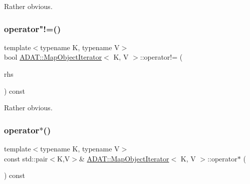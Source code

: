 Rather obvious. 

\mbox{\label{classADAT_1_1MapObjectIterator_a1110663c46b0e652d8ecd0dbe80bd255}} 
\subsubsection{\texorpdfstring{operator"!=()}{operator!=()}\hspace{0.1cm}{\footnotesize\ttfamily [3/3]}}
{\footnotesize\ttfamily template$<$typename K, typename V$>$ \\
bool \mbox{\hyperlink{classADAT_1_1MapObjectIterator}{A\+D\+A\+T\+::\+Map\+Object\+Iterator}}$<$ K, V $>$\+::operator!= (\begin{DoxyParamCaption}\item[{const \mbox{\hyperlink{classADAT_1_1MapObjectIterator}{Map\+Object\+Iterator}}$<$ K, V $>$ \&}]{rhs }\end{DoxyParamCaption}) const\hspace{0.3cm}{\ttfamily [inline]}}



Rather obvious. 

\mbox{\label{classADAT_1_1MapObjectIterator_a3faecdcae68181e91e40dad404296ed7}} 
\subsubsection{\texorpdfstring{operator$\ast$()}{operator*()}\hspace{0.1cm}{\footnotesize\ttfamily [1/3]}}
{\footnotesize\ttfamily template$<$typename K, typename V$>$ \\
const std\+::pair$<$K,V$>$\& \mbox{\hyperlink{classADAT_1_1MapObjectIterator}{A\+D\+A\+T\+::\+Map\+Object\+Iterator}}$<$ K, V $>$\+::operator$\ast$ (\begin{DoxyParamCaption}\item[{void}]{ }\end{DoxyParamCaption}) const\hspace{0.3cm}{\ttfamily [inline]}}

